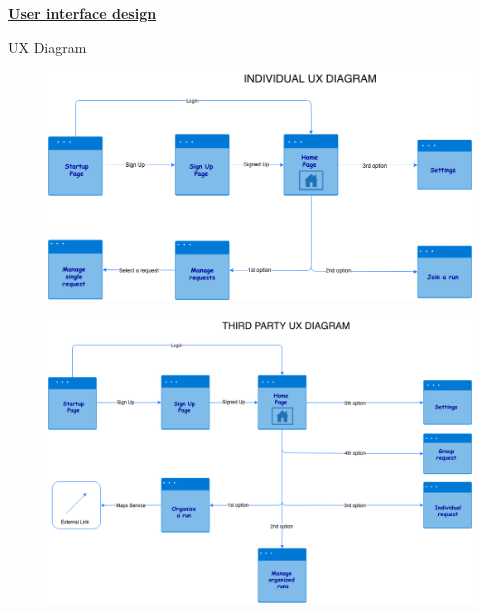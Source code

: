 	\underline{\textbf{User interface design}}
	\begin{legal}
	\item UX Diagram
	
	\begin{figure}[H]
		\includegraphics[width=\linewidth]{../images/design/IndividualUX.png}
	\end{figure}
	\begin{figure}[H]
		\includegraphics[width=\linewidth]{../images/design/ThirdPartyUX.png}
	\end{figure}
	
	\end{legal}

